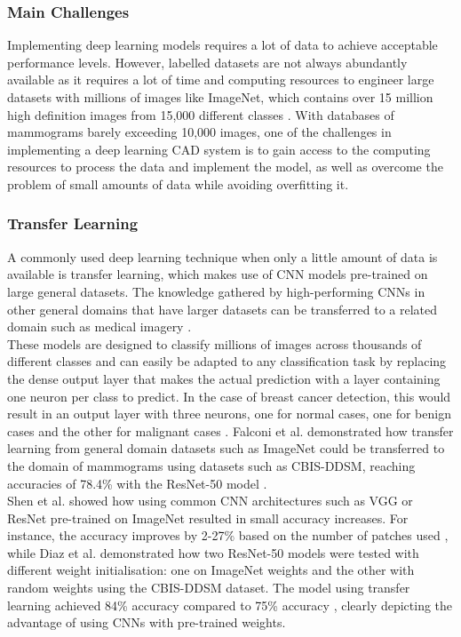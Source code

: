 \subsubsection{Main Challenges}

Implementing deep learning models requires a lot of data to achieve acceptable performance levels. However, labelled datasets are not always abundantly available as it requires a lot of time and computing resources to engineer large datasets with millions of images \citep{Krizhevsky2012} like ImageNet, which contains over 15 million high definition images from 15,000 different classes \citep{Deng2010}. With databases of mammograms barely exceeding 10,000 images, one of the challenges in implementing a deep learning CAD system is to gain access to the computing resources to process the data and implement the model, as well as overcome the problem of small amounts of data while avoiding overfitting it.

\subsubsection{Transfer Learning}

A commonly used deep learning technique when only a little amount of data is available is transfer learning, which makes use of CNN models pre-trained on large general datasets. The knowledge gathered by high-performing CNNs in other general domains that have larger datasets can be transferred to a related domain such as medical imagery \citep{Falconi2019}.\\

These models are designed to classify millions of images across thousands of different classes and can easily be adapted to any classification task by replacing the dense output layer that makes the actual prediction with a layer containing one neuron per class to predict. In the case of breast cancer detection, this would result in an output layer with three neurons, one for normal cases, one for benign cases and the other for malignant cases \citep{Geron2019}. Falconi et al. demonstrated how transfer learning from general domain datasets such as ImageNet could be transferred to the domain of mammograms using datasets  such as CBIS-DDSM, reaching accuracies of 78.4\% with the ResNet-50 model \citep{Falconi2019}.\\

Shen et al. showed how using common CNN architectures such as VGG or ResNet pre-trained on ImageNet resulted in small accuracy increases. For instance, the accuracy improves by 2-27\% based on the number of patches used \citep{Shen2017}, while Diaz et al. demonstrated how two ResNet-50 models were tested with different weight initialisation: one on ImageNet weights and the other with random weights using the CBIS-DDSM dataset. The model using transfer learning achieved  84\% accuracy compared to 75\% accuracy \citep{Diaz2018}, clearly depicting the advantage of using CNNs with pre-trained weights. 

